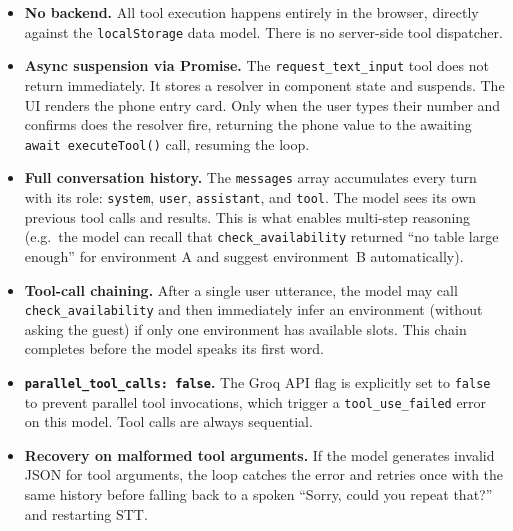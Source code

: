 \documentclass[12pt,a4paper,oneside]{report}
\begin{document}
\begin{itemize}[leftmargin=1.5em, topsep=4pt, itemsep=4pt]
  \item \textbf{No backend.} All tool execution happens entirely in the
        browser, directly against the \texttt{localStorage} data model.
        There is no server-side tool dispatcher.

  \item \textbf{Async suspension via Promise.} The
        \texttt{request\_text\_input} tool does not return immediately. It
        stores a resolver in component state and suspends. The UI renders
        the phone entry card. Only when the user types their number and
        confirms does the resolver fire, returning the phone value to the
        awaiting \texttt{await executeTool()} call, resuming the loop.

  \item \textbf{Full conversation history.} The \texttt{messages} array
        accumulates every turn with its role: \texttt{system},
        \texttt{user}, \texttt{assistant}, and \texttt{tool}. The model
        sees its own previous tool calls and results. This is what enables
        multi-step reasoning (e.g.\ the model can recall that
        \texttt{check\_availability} returned ``no table large enough''
        for environment A and suggest environment~B automatically).

  \item \textbf{Tool-call chaining.} After a single user utterance, the
        model may call \texttt{check\_availability} and then immediately
        infer an environment (without asking the guest) if only one
        environment has available slots. This chain completes before the
        model speaks its first word.

  \item \textbf{\texttt{parallel\_tool\_calls: false}.} The Groq API flag
        is explicitly set to \texttt{false} to prevent parallel tool
        invocations, which trigger a \texttt{tool\_use\_failed} error on
        this model. Tool calls are always sequential.

  \item \textbf{Recovery on malformed tool arguments.} If the model
        generates invalid JSON for tool arguments, the loop catches the
        error and retries once with the same history before falling back
        to a spoken ``Sorry, could you repeat that?'' and restarting STT.
\end{itemize}
\end{document}
